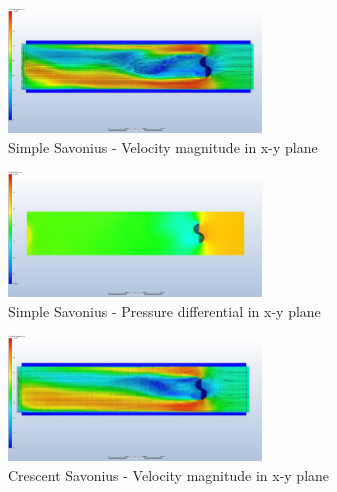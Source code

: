 \documentclass[12pt]{article}
\begin{document}
\\
\begin{figure}[H]
\begin{center}
\includegraphics[width=0.6\textwidth]{CFD_Results/S_VM}
\caption[p1] {Simple Savonius - Velocity magnitude in x-y plane}
\label{ssv}
\end{center}
\end{figure}
\begin{figure}[H]
\begin{center}
\includegraphics[width=0.6\textwidth]{CFD_Results/S_P}
\caption[p1] {Simple Savonius - Pressure differential in x-y plane}
\label{ssp}
\end{center}
\end{figure}
\begin{figure}[H]
\begin{center}
\includegraphics[width=0.6\textwidth]{CFD_Results/C_VM}
\caption[p1] {Crescent Savonius - Velocity magnitude in x-y plane}
\label{cvm}
\end{center}
\end{figure}
\end{document}
